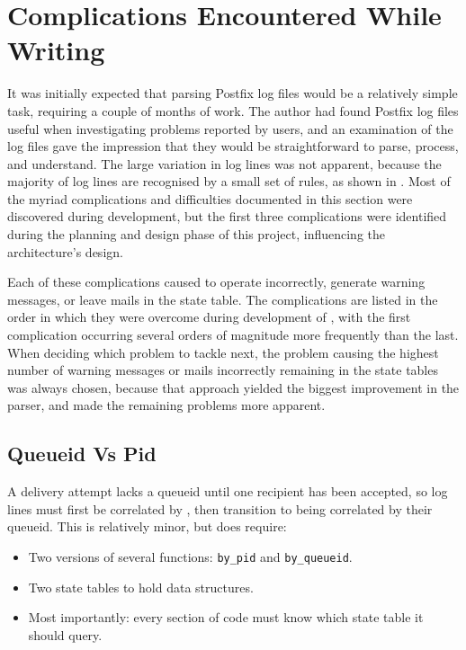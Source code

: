 \section{Complications Encountered While Writing \parsernamelong{}}

\label{complications}

It was initially expected that parsing Postfix log files would be a
relatively simple task, requiring a couple of months of work.  The author
had found Postfix log files useful when investigating problems reported by
users, and an examination of the log files gave the impression that they
would be straightforward to parse, process, and understand.  The large
variation in log lines was not apparent, because the majority of log lines
are recognised by a small set of rules, as shown in .  Most of the myriad complications and difficulties documented in
this section were discovered during \parsernames{} development, but the
first three complications were identified during the planning and design
phase of this project, influencing the architecture's design.

Each of these complications caused \parsername{} to operate incorrectly,
generate warning messages, or leave mails in the state table.  The
complications are listed in the order in which they were overcome during
development of \parsername{}, with the first complication occurring several
orders of magnitude more frequently than the last.  When deciding which
problem to tackle next, the problem causing the highest number of warning
messages or mails incorrectly remaining in the state tables was always
chosen, because that approach yielded the biggest improvement in the
parser, and made the remaining problems more apparent.

\subsection{Queueid Vs Pid}

\label{queueid vs pid}

A delivery attempt lacks a queueid until one recipient has been accepted,
so log lines must first be correlated by  , then
transition to being correlated by their queueid.  This is relatively minor,
but does require:

\begin{itemize}

    \item Two versions of several functions: \texttt{by\_pid} and
        \texttt{by\_queueid}.

    \item Two state tables to hold data structures.

    \item Most importantly: every section of code must know which state
        table it should query.

\end{itemize}

